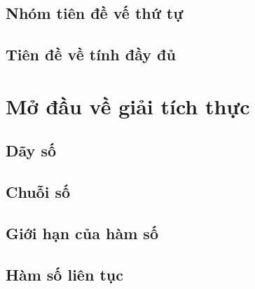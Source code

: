 \subsection{Nhóm tiên đề vế thứ tự}

\subsection{Tiên đề về tính đầy đủ}

\section{Mở đầu về giải tích thực}

\subsection{Dãy số}

\subsection{Chuỗi số}

\subsection{Giới hạn của hàm số}

\subsection{Hàm số liên tục}
